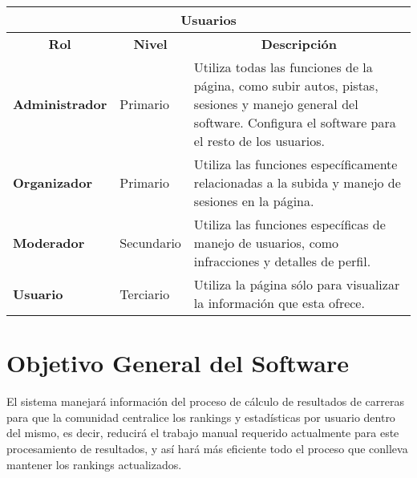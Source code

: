 \begin{center}
	\begin{tabular}{| p{3cm} | p{3cm} | p{10cm} |}
		\hline
		\multicolumn{3}{|c|}{\textbf{Usuarios}} \\
		\hline
		\multicolumn{1}{|c|}{\textbf{Rol}} & \multicolumn{1}{|c|}{\textbf{Nivel}} & \multicolumn{1}{|c|}{\textbf{Descripción}} \\
		\hline
		{\textbf{Administrador}} & Primario & Utiliza todas las funciones de la página, como subir autos, pistas, sesiones y manejo general del software. Configura el software para el resto de los usuarios.\\ \hline
		{\textbf{Organizador}} & Primario & Utiliza las funciones específicamente relacionadas a la subida y manejo de sesiones en la página.\\ \hline
		{\textbf{Moderador}} & Secundario & Utiliza las funciones específicas de manejo de usuarios, como infracciones y detalles de perfil. \\ \hline
		{\textbf{Usuario}} & Terciario & Utiliza la página sólo para visualizar la información que esta ofrece. \\ \hline
	\end{tabular}
\end{center}

\section{Objetivo General del Software}
El sistema manejará información del proceso de cálculo de resultados de carreras para que la comunidad centralice los rankings y estadísticas por usuario dentro del mismo, es decir, reducirá el trabajo manual requerido actualmente para este procesamiento de resultados, y así hará más eficiente todo el proceso que conlleva mantener los rankings actualizados.


